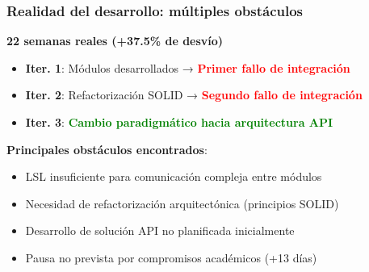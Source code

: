\documentclass[10pt,thmsa]{beamer}
\theoremstyle{plain}
\begin{document}
\begin{frame}
\frametitle{Realidad del desarrollo: múltiples obstáculos}

\textbf{22 semanas reales (+37.5\% de desvío)}

\begin{itemize}
\item \textbf{Iter. 1}: Módulos desarrollados → \textcolor{red}{\textbf{Primer fallo de integración}}
\item \textbf{Iter. 2}: Refactorización SOLID → \textcolor{red}{\textbf{Segundo fallo de integración}}
\item \textbf{Iter. 3}: \textcolor{green}{\textbf{Cambio paradigmático hacia arquitectura API}}
\end{itemize}

\vspace{1em}

\textbf{Principales obstáculos encontrados}:
\begin{itemize}
\item LSL insuficiente para comunicación compleja entre módulos
\item Necesidad de refactorización arquitectónica (principios SOLID)
\item Desarrollo de solución API no planificada inicialmente
\item Pausa no prevista por compromisos académicos (+13 días)
\end{itemize}

\end{frame}
\end{document}
